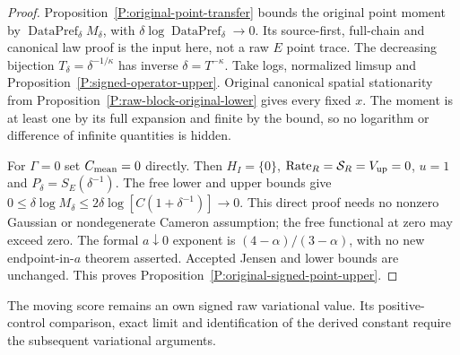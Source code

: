 \begin{proof}
  Proposition~\ref{P:original-point-transfer} bounds the original
  point moment by $\operatorname{DataPref}_\delta M_\delta$,
  with $\delta\log\operatorname{DataPref}_\delta\to0$.
  Its source-first, full-chain and canonical law proof is the input here,
  not a raw $E$ point trace.
  The decreasing bijection $T_\delta=\delta^{-1/\kappa}$ has inverse
  $\delta=T^{-\kappa}$. Take logs, normalized limsup and
  Proposition~\ref{P:signed-operator-upper}.
  Original canonical spatial stationarity from
  Proposition~\ref{P:raw-block-original-lower} gives every fixed $x$.
  The moment is at least one by its full expansion and finite by the bound,
  so no logarithm or difference of infinite quantities is hidden.

  For $\Gamma=0$ set $C_{\rm mean}=0$ directly.
  Then $H_I=\{0\}$, $\operatorname{Rate}_R=\mathcal S_R=V_{\rm up}=0$,
  $u=1$ and $P_\delta=S_E(\delta^{-1})$.
  The free lower and upper bounds give
  $0\le\delta\log M_\delta
  \le2\delta\log[C(1+\delta^{-1})]\to0$.
  This direct proof needs no nonzero Gaussian or nondegenerate
  Cameron assumption; the free functional at zero may exceed zero.
  The formal $a\downarrow0$ exponent is $(4-\alpha)/(3-\alpha)$,
  with no new endpoint-in-$a$ theorem asserted.
  Accepted Jensen and lower bounds are unchanged.
  This proves Proposition~\ref{P:original-signed-point-upper}.
\end{proof}

The moving score remains an own signed raw variational value.
Its positive-control comparison, exact limit and identification of the
derived constant require the subsequent variational arguments.
